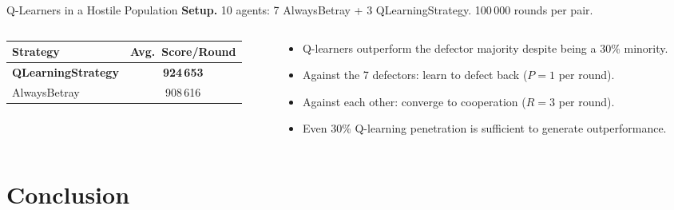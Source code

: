 \documentclass[10pt, aspectratio=169]{beamer}
\begin{document}
\begin{frame}{Q-Learners in a Hostile Population}
  \textbf{Setup.} 10 agents: 7 AlwaysBetray + 3 QLearningStrategy. 100\,000 rounds per pair.

  \vspace{0.8em}
  \begin{columns}[T]
    \begin{column}{0.44\textwidth}
      \centering
      \begin{tabular}{lc}
        \toprule
        Strategy & Avg.\ Score/Round \\
        \midrule
        \textbf{QLearningStrategy} & \textbf{924\,653} \\
        AlwaysBetray               & 908\,616          \\
        \bottomrule
      \end{tabular}
    \end{column}
    \begin{column}{0.52\textwidth}
      \begin{itemize}
        \item Q-learners \alert{outperform the defector majority} despite being a 30\% minority.
        \item Against the 7 defectors: learn to defect back (\(P = 1\) per round).
        \item Against each other: converge to cooperation (\(R = 3\) per round).
        \item Even 30\% Q-learning penetration is sufficient to generate outperformance.
      \end{itemize}
    \end{column}
  \end{columns}
\end{frame}



\section{Conclusion}
\end{document}
